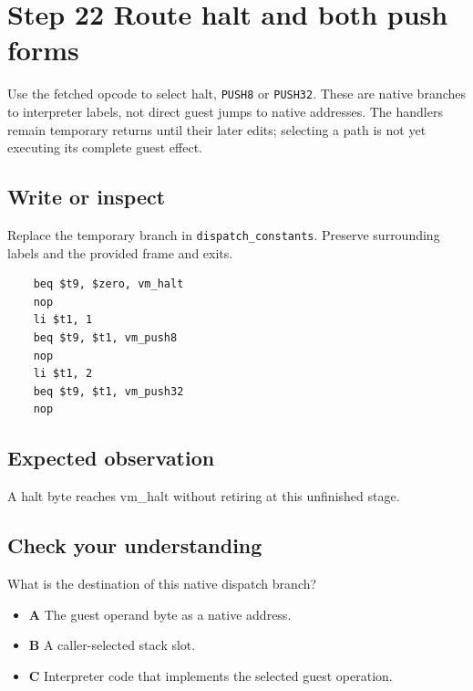 \section{Step 22 Route halt and both push forms}\label{vm-s22}

Use the fetched opcode to select halt, \texttt{PUSH8} or \texttt{PUSH32}. These are native branches to interpreter labels, not direct guest jumps to native addresses. The handlers remain temporary returns until their later edits; selecting a path is not yet executing its complete guest effect.

\subsection{Write or inspect}
Replace the temporary branch in \texttt{dispatch\_constants}. Preserve surrounding labels and the provided frame and exits.

\begin{verbatim}
    beq $t9, $zero, vm_halt
    nop
    li $t1, 1
    beq $t9, $t1, vm_push8
    nop
    li $t1, 2
    beq $t9, $t1, vm_push32
    nop
\end{verbatim}
\subsection{Expected observation}
A halt byte reaches vm\_halt without retiring at this unfinished stage.

\subsection{Check your understanding}
What is the destination of this native dispatch branch?

\begin{itemize}
  \item \textbf{A} The guest operand byte as a native address.
  \item \textbf{B} A caller-selected stack slot.
  \item \textbf{C} Interpreter code that implements the selected guest operation.
\end{itemize}

